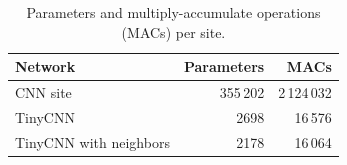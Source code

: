 \begin{table}[tbp]
    \centering
    \caption{Parameters and multiply-accumulate operations (MACs) per site.}
    \label{tab:size}
    \begin{tabular}{@{}lrr@{}}
        \toprule
        Network & Parameters & MACs \\
        \midrule
        CNN site & 355\,202 & 2\,124\,032 \\
        TinyCNN & 2698 & 16\,576 \\
        TinyCNN with neighbors & 2178 & 16\,064 \\
        \bottomrule
    \end{tabular}
\end{table}
